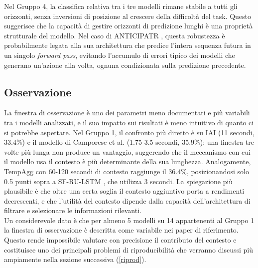 Nel Gruppo 4, la classifica relativa tra i tre modelli rimane stabile a tutti gli orizzonti, senza inversioni di posizione al crescere della difficoltà del task. Questo suggerisce che la capacità di gestire orizzonti di predizione lunghi è una proprietà strutturale del modello. Nel caso di ANTICIPATR \cite{nawhal2022rethinking}, questa robustezza è probabilmente legata alla sua architettura che predice l'intera sequenza futura in un singolo \textit{forward pass}, evitando l'accumulo di errori tipico dei modelli che generano un'azione alla volta, ognuna condizionata sulla predizione precedente.
\subsection{Osservazione}
La finestra di osservazione è uno dei parametri meno documentati e più variabili tra i modelli analizzati, e il suo impatto sui risultati è meno intuitivo di quanto ci si potrebbe aspettare. Nel Gruppo 1, il confronto più diretto è su IAI \cite{zhang2020egocentric} (11 secondi, 33.4\%) e il modello di Camporese et al. \cite{camporese2021knowledge} (1.75-3.5 secondi, 35.9\%): una finestra tre volte più lunga non produce un vantaggio, suggerendo che il meccanismo con cui il modello usa il contesto è più determinante della sua lunghezza. Analogamente, TempAgg \cite{sener2021technical, sener2020temporal} con 60-120 secondi di contesto raggiunge il 36.4\%, posizionandosi solo 0.5 punti sopra a SF-RU-LSTM \cite{osman2021slowfast}, che utilizza 3 secondi. La spiegazione più plausibile è che oltre una certa soglia il contesto aggiuntivo porta a rendimenti decrescenti, e che l'utilità del contesto dipende dalla capacità dell'architettura di filtrare e selezionare le informazioni rilevanti. \\
Un considerevole dato è che per almeno 5 modelli su 14 appartenenti al Gruppo 1 la finestra di osservazione è descritta come variabile nei paper di riferimento. Questo rende impossibile valutare con precisione il contributo del contesto e costituisce uno dei principali problemi di riproducibilità che verranno discussi più ampiamente nella sezione successiva (\ref{riprod}). \\
